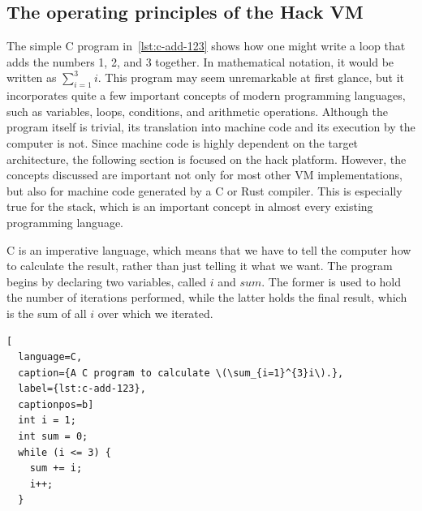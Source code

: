 
\subsection{The operating principles of the Hack VM}
The simple C program in~\cref{lst:c-add-123} shows how one might write a loop that adds the numbers 1, 2, and 3 together.
In mathematical notation, it would be written as \(\sum_{i=1}^{3}i\).
This program may seem unremarkable at first glance, but it incorporates quite a few important concepts of modern programming languages, such as variables, loops, conditions, and arithmetic operations.
Although the program itself is trivial, its translation into machine code and its execution by the computer is not.
Since machine code is highly dependent on the target architecture, the following section is focused on the hack platform. However, the concepts discussed are important not only for most other VM implementations, but also for machine code generated by a C or Rust compiler.
This is especially true for the stack, which is an important concept in almost every existing programming language.

C is an imperative language, which means that we have to tell the computer how to calculate the result, rather than just telling it what we want. The program begins by declaring two variables, called \(i\) and \(sum\). The former is used to hold the number of iterations performed, while the latter holds the final result, which is the sum of all \(i\) over which we iterated.

\begin{lstlisting}[
  language=C,
  caption={A C program to calculate \(\sum_{i=1}^{3}i\).},
  label={lst:c-add-123},
  captionpos=b]
  int i = 1;
  int sum = 0;
  while (i <= 3) {
    sum += i;
    i++;
  }
\end{lstlisting}

